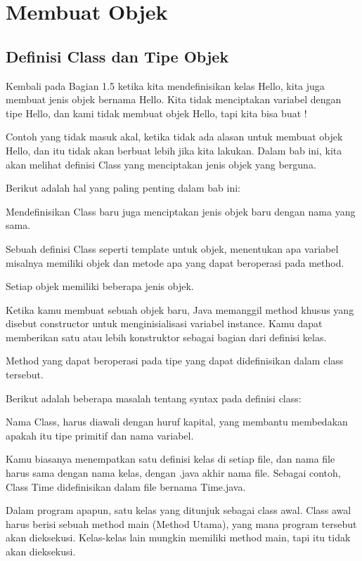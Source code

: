 \chapter{Membuat Objek}
\section{Definisi Class dan Tipe Objek}

Kembali pada Bagian 1.5 ketika kita mendefinisikan kelas Hello, kita juga membuat jenis objek bernama Hello. Kita tidak menciptakan variabel dengan tipe Hello, dan kami tidak membuat objek Hello, tapi kita bisa buat !

Contoh yang tidak masuk akal, ketika tidak ada alasan untuk membuat objek Hello, dan itu tidak akan berbuat lebih jika kita lakukan. Dalam bab ini, kita akan melihat definisi Class yang menciptakan jenis objek yang berguna.

Berikut adalah hal yang paling penting dalam bab ini:

\textbullet  Mendefinisikan Class baru juga menciptakan jenis objek baru dengan nama yang sama.

\textbullet  Sebuah definisi Class seperti template untuk objek, menentukan apa variabel misalnya memiliki objek dan metode apa yang dapat beroperasi pada method.

\textbullet  Setiap objek memiliki beberapa jenis objek.

\textbullet  Ketika kamu membuat sebuah objek baru, Java memanggil method khusus yang disebut constructor untuk menginisialisasi variabel instance. Kamu dapat memberikan satu atau lebih konstruktor sebagai bagian dari definisi kelas.

\textbullet  Method yang dapat beroperasi pada tipe yang dapat didefinisikan dalam class tersebut.

Berikut adalah beberapa masalah tentang syntax pada definisi class:

\textbullet Nama Class, harus diawali dengan huruf kapital, yang membantu membedakan apakah itu tipe primitif dan nama variabel.

\textbullet Kamu biasanya menempatkan satu definisi kelas di setiap file, dan nama file harus sama dengan nama kelas, dengan .java akhir nama file. Sebagai contoh, Class Time didefinisikan dalam file bernama Time.java.

\textbullet Dalam program apapun, satu kelas yang ditunjuk sebagai class awal. Class awal harus berisi sebuah method main (Method Utama), yang mana program tersebut akan dieksekusi. Kelas-kelas lain mungkin memiliki method main, tapi itu tidak akan dieksekusi.

